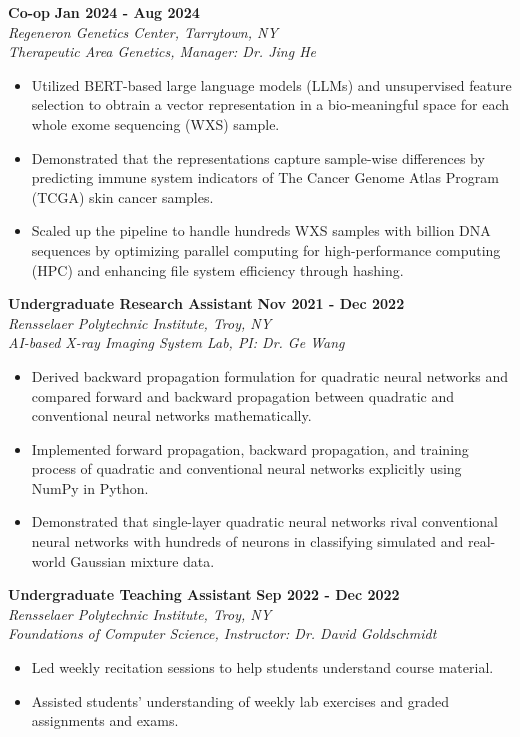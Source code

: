 \documentclass[letterpaper, 11pt]{article}
\newcommand{\subsectionvspace}{\vspace{8pt}}
\begin{document}
    \textbf{Co-op} \hfill 
    \textbf{Jan 2024 - Aug 2024} \\
    \textit{Regeneron Genetics Center, Tarrytown, NY} \\
    \textit{Therapeutic Area Genetics, Manager: Dr. Jing He}
    \begin{itemize}
        \item Utilized BERT-based large language models (LLMs) and unsupervised feature selection to obtrain a vector representation in a bio-meaningful space for each whole exome sequencing (WXS) sample.
        \item Demonstrated that the representations capture sample-wise differences by predicting immune system indicators of The Cancer Genome Atlas Program (TCGA) skin cancer samples.
        \item Scaled up the pipeline to handle hundreds WXS samples with billion DNA sequences by optimizing parallel computing for high-performance computing (HPC) and enhancing file system efficiency through hashing.
    \end{itemize}

    \subsectionvspace

    \textbf{Undergraduate Research Assistant} \hfill 
    \textbf{Nov 2021 - Dec 2022} \\
    \textit{Rensselaer Polytechnic Institute, Troy, NY} \\
    \textit{AI-based X-ray Imaging System Lab, PI: Dr. Ge Wang}
    \begin{itemize}
        \item Derived backward propagation formulation for quadratic neural networks and compared forward and backward propagation between quadratic and conventional neural networks mathematically.
        \item Implemented forward propagation, backward propagation, and training process of quadratic and conventional neural networks explicitly using NumPy in Python.
        \item Demonstrated that single-layer quadratic neural networks rival conventional neural networks with hundreds of neurons in classifying simulated and real-world Gaussian mixture data.
    \end{itemize}

    \subsectionvspace

    \textbf{Undergraduate Teaching Assistant} \hfill 
    \textbf{Sep 2022 - Dec 2022} \\
    \textit{Rensselaer Polytechnic Institute, Troy, NY} \\
    \textit{Foundations of Computer Science, Instructor: Dr. David Goldschmidt}
    \begin{itemize}
        \item Led weekly recitation sessions to help students understand course material.
        \item Assisted students' understanding of weekly lab exercises and graded assignments and exams.
    \end{itemize}
\end{document}
